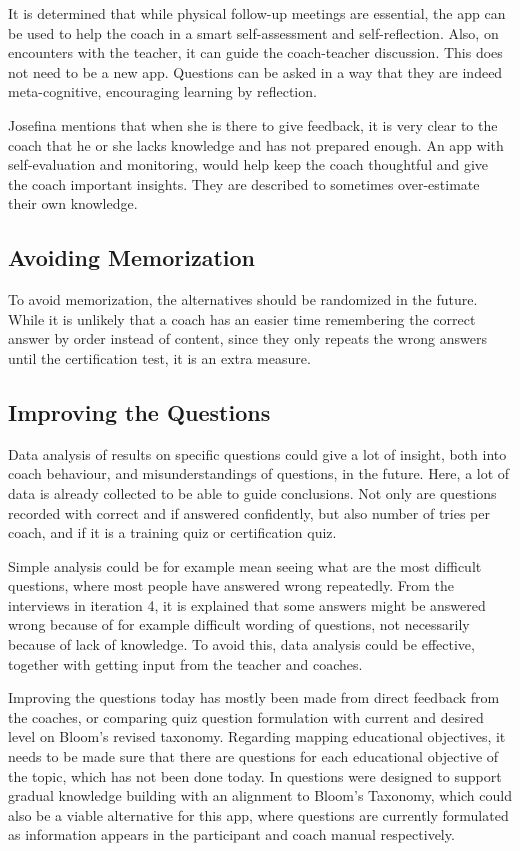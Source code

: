 It is determined that while physical follow-up meetings are essential, the app can be used to help the coach in a smart self-assessment and self-reflection. Also, on encounters with the teacher, it can guide the coach-teacher discussion. This does not need to be a new app. Questions can be asked in a way that they are indeed meta-cognitive, encouraging learning by reflection.

Josefina mentions that when she is there to give feedback, it is very clear to the coach that he or she lacks knowledge and has not prepared enough. An app with self-evaluation and monitoring, would help keep the coach thoughtful and give the coach important insights. They are described to sometimes over-estimate their own knowledge.

\subsection{Avoiding Memorization}
To avoid memorization, the alternatives should be randomized in the future. While it is unlikely that a coach has an easier time remembering the correct answer by order instead of content, since they only repeats the wrong answers until the certification test, it is an extra measure.

\subsection{Improving the Questions}
Data analysis of results on specific questions could give a lot of insight, both into coach behaviour, and misunderstandings of questions, in the future. Here, a lot of data is already collected to be able to guide conclusions. Not only are questions recorded with correct and if answered confidently, but also number of tries per coach, and if it is a training quiz or certification quiz.

Simple analysis could be for example mean seeing what are the most difficult questions, where most people have answered wrong repeatedly. From the interviews in iteration 4, it is explained that some answers might be answered wrong because of for example difficult wording of questions, not necessarily because of lack of knowledge. To avoid this, data analysis could be effective, together with getting input from the teacher and coaches.

Improving the questions today has mostly been made from direct feedback from the coaches, or comparing quiz question formulation with current and desired level on Bloom's revised taxonomy. Regarding mapping educational objectives, it needs to be made sure that there are questions for each educational objective of the topic, which has not been done today. In \cite{yengin} questions were designed to support gradual knowledge building with an alignment to Bloom’s Taxonomy, which could also be a viable alternative for this app, where questions are currently formulated as information appears in the participant and coach manual respectively.

